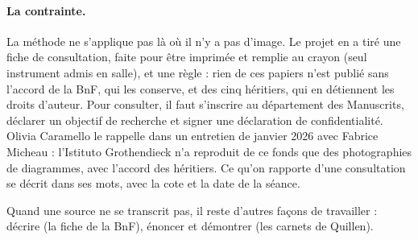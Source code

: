 \paragraph{La contrainte.} La méthode ne s'applique pas là où il n'y a pas d'image.
Le projet en a tiré une fiche de consultation, faite pour être imprimée et remplie au
crayon (seul instrument admis en salle), et une règle : rien de ces papiers n'est publié
sans l'accord de la BnF, qui les conserve, et des cinq héritiers, qui en détiennent les
droits d'auteur. Pour consulter, il faut s'inscrire au département des Manuscrits, déclarer
un objectif de recherche et signer une déclaration de confidentialité. Olivia Caramello le
rappelle dans un entretien de janvier 2026 avec Fabrice Micheau : l'Istituto Grothendieck
n'a reproduit de ce fonds que des photographies de diagrammes, avec l'accord des héritiers.
Ce qu'on rapporte d'une consultation se décrit dans ses mots, avec la cote et la date de la
séance.

\begin{exemple}
Quand une source ne se transcrit pas, il reste d'autres façons de travailler : décrire
(la fiche de la BnF), énoncer et démontrer (les carnets de Quillen).
\end{exemple}
